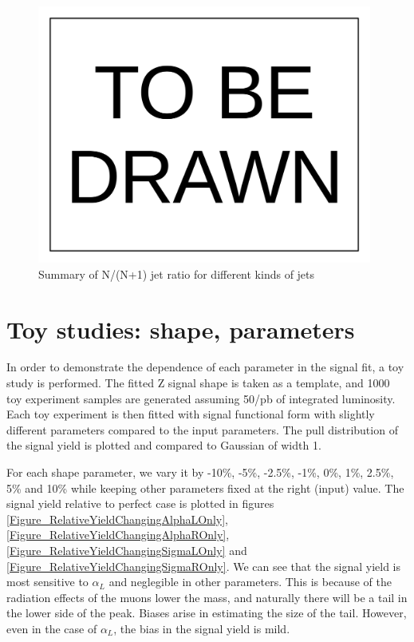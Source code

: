 \documentclass[10pt,a4paper,onecolumn]{article}
\begin{document}
\begin{figure}
   \includegraphics[width=110mm]{ToBeDrawn.pdf}
   \caption{Summary of N/(N+1) jet ratio for different kinds of jets}
   \label{Figure_RatioFromDataUncorrectedCaloJet}
\end{figure}


\section{Toy studies: shape, parameters}

In order to demonstrate the dependence of each parameter in the signal fit, a toy study is performed.
The fitted Z signal shape is taken as a template, and 1000 toy experiment samples are generated assuming 50/pb of integrated luminosity.
Each toy experiment is then fitted with signal functional form with slightly different parameters compared to the input parameters.
The pull distribution of the signal yield is plotted and compared to Gaussian of width 1.

For each shape parameter, we vary it by -10\%, -5\%, -2.5\%, -1\%, 0\%, 1\%, 2.5\%, 5\% and 10\% while keeping other parameters fixed at the right (input) value.
The signal yield relative to perfect case is plotted in figures \ref{Figure_RelativeYieldChangingAlphaLOnly}, \ref{Figure_RelativeYieldChangingAlphaROnly},
\ref{Figure_RelativeYieldChangingSigmaLOnly} and \ref{Figure_RelativeYieldChangingSigmaROnly}.
We can see that the signal yield is most sensitive to $\alpha_L$ and neglegible in other parameters.
This is because of the radiation effects of the muons lower the mass, and naturally there will be a tail in the lower side of the peak.
Biases arise in estimating the size of the tail.
However, even in the case of $\alpha_L$, the bias in the signal yield is mild.
\end{document}
